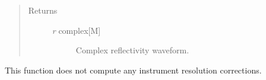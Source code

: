 \documentclass[letterpaper,10pt,english]{sphinxmanual}
\begin{document}
\begin{fulllineitems}
\begin{description}
\end{description}
\begin{quote}\begin{description}
\item[{Returns }] \leavevmode\begin{description}
\item[{\emph{r} \textbar{} complex{[}M{]}}] \leavevmode
Complex reflectivity waveform.

\end{description}

\end{description}\end{quote}

This function does not compute any instrument resolution corrections.

\end{fulllineitems}

\end{document}
